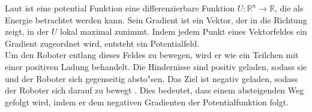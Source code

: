 Laut \cite{Principles:05} ist eine potential Funktion eine differenzierbare Funktion $U : \mathbb{R}^{n} \rightarrow \mathbb{R}$, die als Energie betrachtet werden kann. Sein Gradient ist ein Vektor, der in die Richtung zeigt, in der $U$ lokal maximal zunimmt. Indem jedem Punkt eines Vektorfeldes ein Gradient zugeordnet wird, entsteht ein Potentialfeld.\\
Um den Roboter entlang dieses Feldes zu bewegen, wird er wie ein Teilchen mit einer positiven Ladung behandelt. Die Hindernisse sind positiv geladen, sodass sie und der Roboter sich gegenseitig absto{"s}en. Das Ziel ist negativ geladen, sodass der Roboter sich darauf zu bewegt \cite{Yong:92}. Dies bedeutet, dass einem absteigenden Weg gefolgt wird, indem er dem negativen Gradienten der Potentialfunktion folgt.


